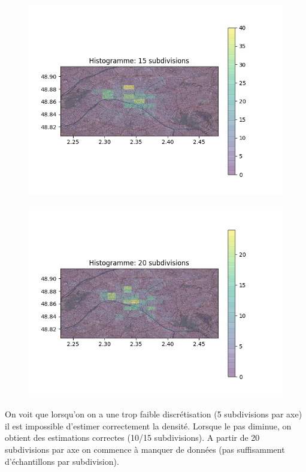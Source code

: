 \documentclass[a4paper]{article}
\begin{document}
\begin{figure}[ht!]
\begin{center}
\begin{minipage}{0.45\textwidth}
\includegraphics[scale=0.5]{Histo15.png}
\label{f1_trajectoire}
\end{minipage}\hfill
\begin{minipage}{0.45\textwidth}
\includegraphics[scale=0.5]{Histo20.png}
\label{f2_trajectoire}
\end{minipage}
\end{center}
\end{figure}

On voit que lorsqu'on on a une trop faible discrétisation (5 subdivisions par axe) il est impossible d'estimer correctement la densité. Lorsque le pas diminue, on obtient des estimations correctes (10/15 subdivisions). A partir de 20 subdivisions par axe on commence à manquer de données (pas suffisamment d'échantillons par subdivision).
\end{document}
